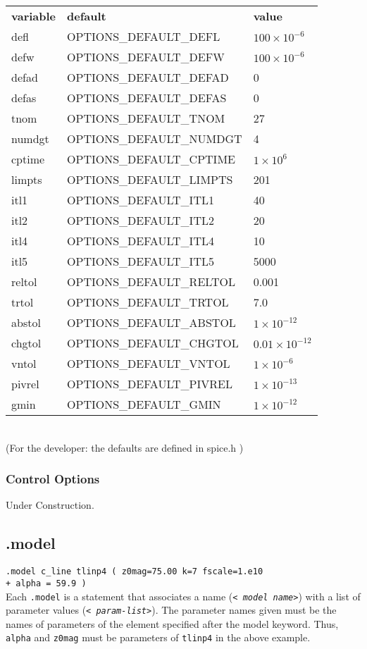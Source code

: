 \begin{tabular}{lll}
{\bf variable} & {\bf default} & {\bf value} \\
defl    & OPTIONS\_DEFAULT\_DEFL & $100\times 10^{-6}$\\
defw    & OPTIONS\_DEFAULT\_DEFW & $100\times 10^{-6}$\\
defad   & OPTIONS\_DEFAULT\_DEFAD & 0 \\
defas   & OPTIONS\_DEFAULT\_DEFAS & 0\\
tnom    & OPTIONS\_DEFAULT\_TNOM & 27\\
numdgt  & OPTIONS\_DEFAULT\_NUMDGT & 4\\
cptime  & OPTIONS\_DEFAULT\_CPTIME & $1\times 10^6$\\
limpts  & OPTIONS\_DEFAULT\_LIMPTS & 201\\
itl1    & OPTIONS\_DEFAULT\_ITL1 & 40\\
itl2    & OPTIONS\_DEFAULT\_ITL2 & 20\\
itl4    & OPTIONS\_DEFAULT\_ITL4 & 10\\
itl5    & OPTIONS\_DEFAULT\_ITL5 & 5000\\
reltol  & OPTIONS\_DEFAULT\_RELTOL & 0.001\\
trtol   & OPTIONS\_DEFAULT\_TRTOL & 7.0\\
abstol  & OPTIONS\_DEFAULT\_ABSTOL & $1\times 10^{-12}$\\
chgtol  & OPTIONS\_DEFAULT\_CHGTOL &$0.01\times 10^{-12}$\\
vntol   & OPTIONS\_DEFAULT\_VNTOL &$1\times 10^{-6}$\\
pivrel  & OPTIONS\_DEFAULT\_PIVREL &$1\times 10^{-13}$\\
gmin    & OPTIONS\_DEFAULT\_GMIN &$1\times 10^{-12}$
\end{tabular}\\[0.2in]
(For the developer: the defaults are defined in spice.h )

\subsubsection{Control Options}

Under Construction.

\subsection{.model}

{\tt .model c\_line tlinp4 ( z0mag=75.00 k=7 fscale=1.e10 \\
+ alpha = 59.9 )} \medskip \\
Each {\tt .model} is a statement that associates a name ({\tt <{\it
model name}>}) with a list of parameter values ({\tt <{\it
param-list}>}).  The parameter names given must be the names of
parameters of the element specified after the model keyword.  Thus,
{\tt alpha} and {\tt z0mag} must be parameters of {\tt tlinp4} in the
above example.

